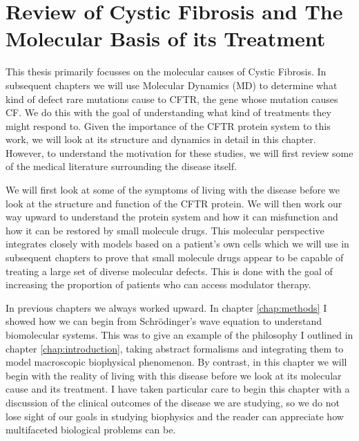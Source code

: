 \chapter{Review of Cystic Fibrosis and The Molecular Basis of its Treatment}
\label{chap:cftr}
\newpage





This thesis primarily focusses on the molecular causes of Cystic Fibrosis. In subsequent chapters we will use Molecular Dynamics (MD) to determine what kind of defect rare mutations cause to CFTR, the gene whose mutation causes CF. We do this with the goal of understanding what kind of treatments they might respond to. Given the importance of the CFTR protein system to this work, we will look at its structure and dynamics in detail in this chapter. However, to understand the motivation for these studies, we will first review some of the medical literature surrounding the disease itself. 

We will first look at some of the symptoms of living with the disease before we look at the structure and function of the CFTR protein. We will then work our way upward to understand the protein system and how it can misfunction and how it can be restored by small molecule drugs. This molecular perspective integrates closely with models based on a patient's own cells which we will use in subsequent chapters to prove that small molecule drugs appear to be capable of treating a large set of diverse molecular defects. This is done with the goal of increasing the proportion of patients who can access modulator therapy.

In previous chapters we always worked upward. In chapter \ref{chap:methods} I showed how we can begin from Schr\"odinger's wave equation to understand biomolecular systems. This was to give an example of the philosophy I outlined in chapter \ref{chap:introduction}, taking abstract formalisms and integrating them to model macroscopic biophysical phenomenon. By contrast, in this chapter we will begin with the reality of living with this disease before we look at its molecular cause and its treatment. I have taken particular care to begin this chapter with a discussion of the clinical outcomes of the disease we are studying, so we do not lose sight of our goals in studying biophysics and the reader can appreciate how multifaceted biological problems can be. 

